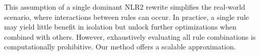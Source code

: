 

 This assumption of a single dominant NLR2 rewrite simplifies the real-world scenario, where interactions between rules can occur. In practice, a single rule may yield little benefit in isolation but unlock further optimizations when combined with others. However, exhaustively evaluating all rule combinations is computationally prohibitive. Our method offers a scalable approximation.





